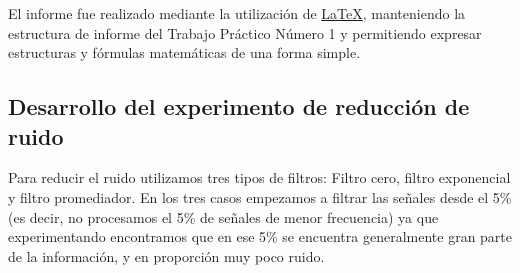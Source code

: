El informe fue realizado mediante la utilizaci\'on de \href{http://www.latex-project.org/}{LaTeX},
 manteniendo la estructura de informe del Trabajo Pr\'actico N\'umero 1 y
permitiendo expresar estructuras y f\'ormulas matem\'aticas de una forma simple.

\subsection{Desarrollo del experimento de reducci\'on de ruido}

Para reducir el ruido utilizamos tres tipos de filtros: Filtro cero, filtro exponencial y filtro promediador.
En los tres casos empezamos a filtrar las se\~nales desde el 5\% (es decir, no procesamos el 5\% de se\~nales
de menor frecuencia) ya que experimentando encontramos que en ese 5\% se encuentra generalmente gran parte de
la informaci\'on, y en proporci\'on muy poco ruido.
